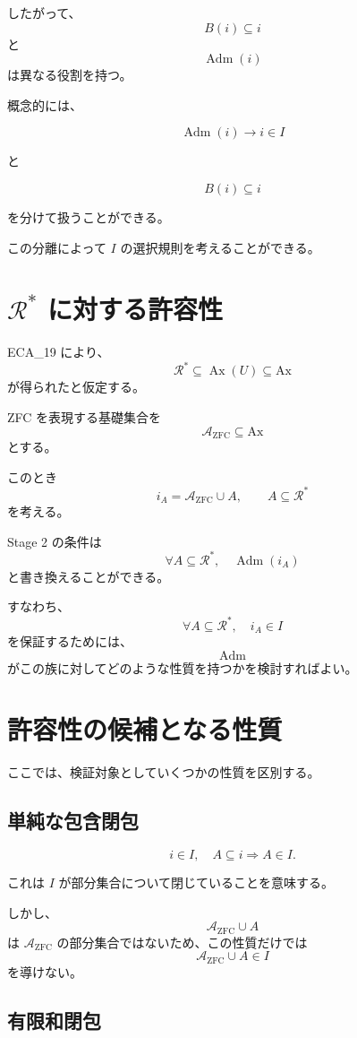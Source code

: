 \documentclass[a4paper,11pt]{article}
\newcommand{\Ax}{\mathrm{Ax}}
\begin{document}
したがって、
\[
B(i)\subseteq i
\]
と
\[
\operatorname{Adm}(i)
\]
は異なる役割を持つ。

概念的には、

\[
\operatorname{Adm}(i)
\longrightarrow
i\in I
\]

と

\[
B(i)\subseteq i
\]

を分けて扱うことができる。

この分離によって $I$ の選択規則を考えることができる。

\section{$\mathcal{R}^*$ に対する許容性}

ECA_19 により、
\[
\mathcal{R}^*
\subseteq\operatorname{Ax}(U)
\subseteq\Ax
\]
が得られたと仮定する。

ZFC を表現する基礎集合を
\[
\mathcal{A}_{\mathrm{ZFC}}\subseteq\Ax
\]
とする。

このとき
\[
i_A=\mathcal{A}_{\mathrm{ZFC}}\cup A,
\qquad
A\subseteq\mathcal{R}^*
\]
を考える。

Stage 2 の条件は
\[
\boxed{
\forall A\subseteq\mathcal{R}^*,
\quad
\operatorname{Adm}(i_A)
}
\]
と書き換えることができる。

すなわち、
\[
\forall A\subseteq\mathcal{R}^*,
\quad
i_A\in I
\]
を保証するためには、
\[
\operatorname{Adm}
\]
がこの族に対してどのような性質を持つかを検討すればよい。

\section{許容性の候補となる性質}

ここでは、検証対象としていくつかの性質を区別する。

\subsection{単純な包含閉包}

\[
i\in I,\quad A\subseteq i
\Longrightarrow
A\in I.
\]

これは $I$ が部分集合について閉じていることを意味する。

しかし、
\[
\mathcal{A}_{\mathrm{ZFC}}\cup A
\]
は $\mathcal{A}_{\mathrm{ZFC}}$ の部分集合ではないため、この性質だけでは
\[
\mathcal{A}_{\mathrm{ZFC}}\cup A\in I
\]
を導けない。

\subsection{有限和閉包}
\end{document}
